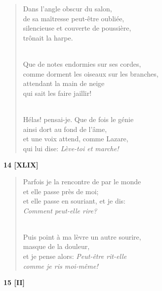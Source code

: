 \documentclass[a4paper,11pt]{book}
\begin{document}
\begin{verse}
Dans l'angle obscur du salon, \\
de sa maîtresse peut-être oubliée, \\
silencieuse et couverte de poussière, \\
trônait la harpe. \\ \

Que de notes endormies sur ses cordes, \\
comme dorment les oiseaux sur les branches, \\
attendant la main de neige \\
qui sait les faire jaillir! \\ \

Hélas! pensai-je. Que de fois le génie \\
ainsi dort au fond de l'âme, \\
et une voix attend, comme Lazare, \\
qui lui dise: {\em Lève-toi et marche!} \\
\end{verse}

\bigskip

\begin{center} {\bf 14 [XLIX]} \end{center}

\begin{verse}
Parfois je la rencontre de par le monde \\
et elle passe près de moi; \\
et elle passe en souriant, et je dis: \\
{\em Comment peut-elle {\em rire\/}?} \\ \

Puis point à ma lèvre un autre sourire, \\
masque de la douleur, \\
et je pense alors: {\em Peut-être rit-elle \\
comme je ris moi-même!} \\
\end{verse}

\bigskip

\begin{center} {\bf 15 [II]} \end{center}
\end{document}
